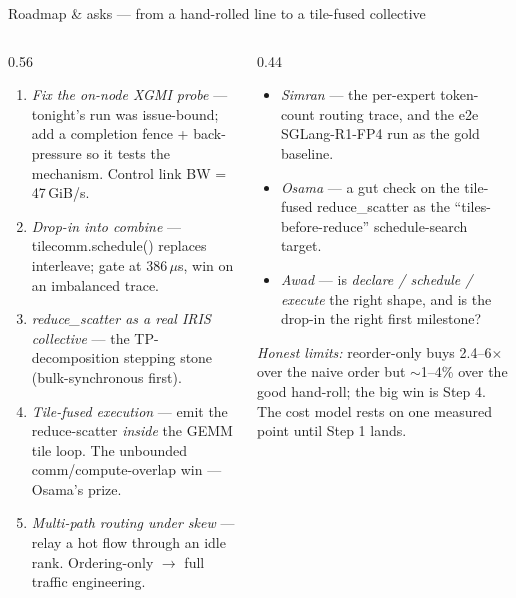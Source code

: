 \documentclass[pdf,aspectratio=169]{beamer}
\newcommand{\empy}[1]{{\color{darkorange}\emph{#1}}}
\newcommand{\empr}[1]{{\color{cardinalred}\emph{#1}}}
\newcommand{\examplebox}[2]{%
\begin{tcolorbox}[colframe=darkcardinal,colback=boxgray,title={#1}]
#2
\end{tcolorbox}}
\newcommand{\mc}[1]{{\ttfamily\small #1}}
\begin{document}
\begin{frame}{Roadmap \& asks --- from a hand-rolled line to a tile-fused collective}
\footnotesize
\begin{columns}
\begin{column}{0.56\textwidth}
\begin{enumerate}\footnotesize
  \item \empr{Fix the on-node XGMI probe} --- tonight's run was issue-bound; add a completion fence + back-pressure so it tests the mechanism. Control link BW = 47\,GiB/s.
  \item \empy{Drop-in into combine} --- \mc{tilecomm.schedule()} replaces \mc{interleave}; gate at 386\,$\mu$s, win on an imbalanced trace.
  \item \empy{reduce\_scatter as a real IRIS collective} --- the TP-decomposition stepping stone (bulk-synchronous first).
  \item \empr{Tile-fused execution} --- emit the reduce-scatter \emph{inside} the GEMM tile loop. The unbounded comm/compute-overlap win --- Osama's prize.
  \item \empr{Multi-path routing under skew} --- relay a hot flow through an idle rank. Ordering-only $\to$ full traffic engineering.
\end{enumerate}
\end{column}
\begin{column}{0.44\textwidth}
\examplebox{What I'd like from you}{\footnotesize
\begin{itemize}\scriptsize
  \item \empy{Simran} --- the per-expert token-count routing trace, and the e2e SGLang-R1-FP4 run as the gold baseline.
  \item \empy{Osama} --- a gut check on the tile-fused reduce\_scatter as the ``tiles-before-reduce'' schedule-search target.
  \item \empy{Awad} --- is \emph{declare / schedule / execute} the right shape, and is the drop-in the right first milestone?
\end{itemize}}
\empr{Honest limits:} reorder-only buys 2.4--6$\times$ over the naive order but $\sim$1--4\% over the good hand-roll; the big win is Step 4. The cost model rests on one measured point until Step 1 lands.
\end{column}
\end{columns}
\end{frame}
\end{document}
